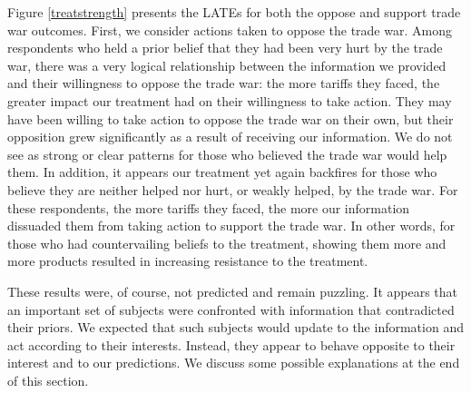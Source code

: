 \documentclass{article}
\begin{document}

Figure \ref{treatstrength} presents the LATEs for both the oppose and support trade war outcomes. First, we consider actions taken to oppose the trade war.
Among respondents who held a prior belief that they had been very hurt by the trade war, there was a very logical relationship between the information we provided and their willingness to oppose the trade war: the more tariffs they faced, the greater impact our treatment had on their willingness to take action. They may have been willing to take action to oppose the trade war on their own, but their opposition grew significantly as a result of receiving our information. 
We do not see as strong or clear patterns for those who believed the trade war would help them.
In addition, it appears our treatment yet again backfires for those who believe they are neither helped nor hurt, or weakly helped, by the trade war.
For these respondents, the more tariffs they faced, the more our information dissuaded them from taking action to support the trade war. In other words, for those who had countervailing beliefs to the treatment, showing them more and more products resulted in increasing resistance to the treatment.

These results were, of course, not predicted and remain puzzling. It appears that an important set of subjects were confronted with information that contradicted their priors. We expected that such subjects would update to the information and act according to their interests. Instead, they appear to behave opposite to their interest and to our predictions. We discuss some possible explanations at the end of this section.
\end{document}
